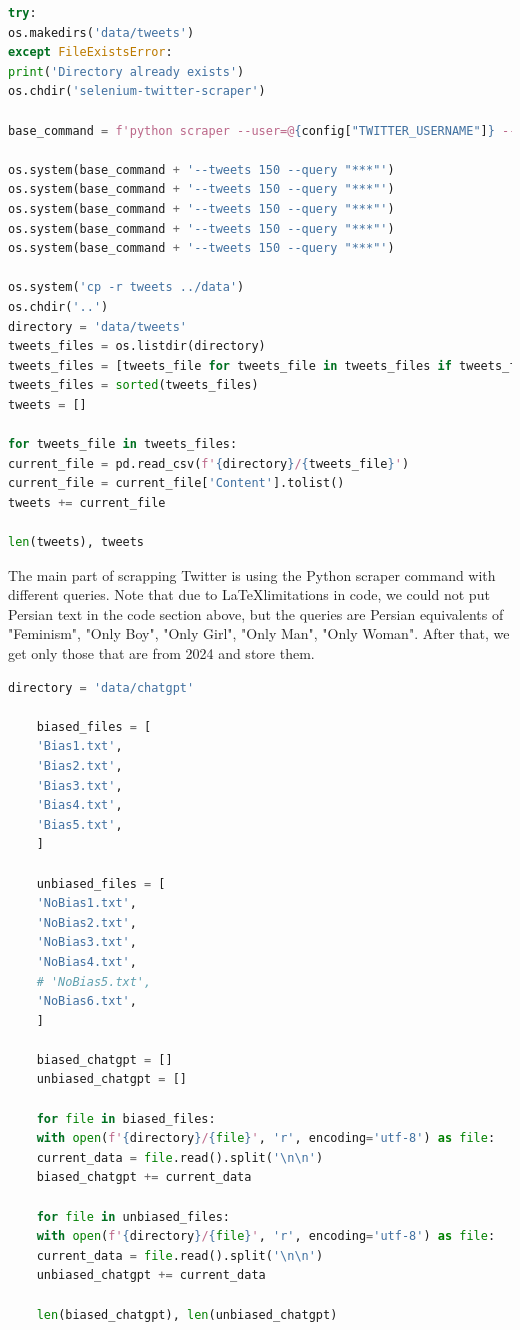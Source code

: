\documentclass{solutionclass} %
\begin{document}
\begin{lstlisting}[language=Python]
try:
os.makedirs('data/tweets')
except FileExistsError:
print('Directory already exists')
os.chdir('selenium-twitter-scraper')

base_command = f'python scraper --user=@{config["TWITTER_USERNAME"]} --password={config["TWITTER_PASSWORD"]} --top '

os.system(base_command + '--tweets 150 --query "***"')
os.system(base_command + '--tweets 150 --query "***"')
os.system(base_command + '--tweets 150 --query "***"')
os.system(base_command + '--tweets 150 --query "***"')
os.system(base_command + '--tweets 150 --query "***"')

os.system('cp -r tweets ../data')
os.chdir('..')
directory = 'data/tweets'
tweets_files = os.listdir(directory)
tweets_files = [tweets_file for tweets_file in tweets_files if tweets_file.startswith('2024')]
tweets_files = sorted(tweets_files)
tweets = []

for tweets_file in tweets_files:
current_file = pd.read_csv(f'{directory}/{tweets_file}')
current_file = current_file['Content'].tolist()
tweets += current_file

len(tweets), tweets
\end{lstlisting}

\begin{solution}
The main part of scrapping Twitter is using the Python scraper command with different queries. Note that due to \LaTeX limitations in code, we could not put Persian text in the code section above, but the queries are Persian equivalents of "Feminism", "Only Boy", "Only Girl", "Only Man", "Only Woman". After that, we get only those that are from 2024 and store them.
\end{solution}



\begin{lstlisting}[language=Python]
	directory = 'data/chatgpt'
	
	biased_files = [
	'Bias1.txt',
	'Bias2.txt',
	'Bias3.txt',
	'Bias4.txt',
	'Bias5.txt',
	]
	
	unbiased_files = [
	'NoBias1.txt',
	'NoBias2.txt',
	'NoBias3.txt',
	'NoBias4.txt',
	# 'NoBias5.txt',
	'NoBias6.txt',
	]
	
	biased_chatgpt = []
	unbiased_chatgpt = []
	
	for file in biased_files:
	with open(f'{directory}/{file}', 'r', encoding='utf-8') as file:
	current_data = file.read().split('\n\n')
	biased_chatgpt += current_data
	
	for file in unbiased_files:
	with open(f'{directory}/{file}', 'r', encoding='utf-8') as file:
	current_data = file.read().split('\n\n')
	unbiased_chatgpt += current_data
	
	len(biased_chatgpt), len(unbiased_chatgpt)
\end{lstlisting}
\end{document}
